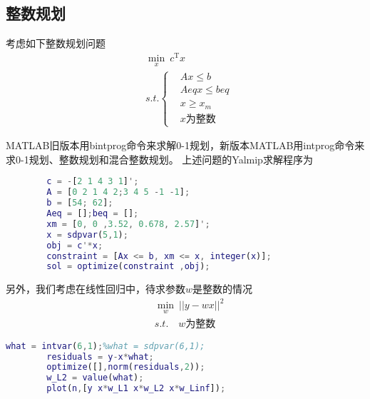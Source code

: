    \subsection{整数规划}
        \par
        考虑如下整数规划问题
        \begin{align*}
        & \min_x \ c^\mathrm{T}x\\
        & s.t.\left\{
        \begin{aligned}
        & Ax \leqslant b\\
        & Aeq x \leqslant beq\\
        & x \geqslant x_m\\
        & x\text{为整数}
        \end{aligned}
        \right.
        \end{align*}
        \par
        MATLAB旧版本用bintprog命令来求解0-1规划，新版本MATLAB用intprog命令来求0-1规划、整数规划和混合整数规划。
        上述问题的Yalmip求解程序为
        \begin{lstlisting}[language = Matlab]
        %% 整数规划
        c = -[2 1 4 3 1]';
        A = [0 2 1 4 2;3 4 5 -1 -1];
        b = [54; 62];
        Aeq = [];beq = [];
        xm = [0, 0 ,3.52, 0.678, 2.57]';
        x = sdpvar(5,1);
        obj = c'*x;
        constraint = [Ax <= b, xm <= x, integer(x)];
        sol = optimize(constraint ,obj);
        \end{lstlisting}
        \par
        另外，我们考虑在线性回归中，待求参数$w$是整数的情况
        \begin{align*}
        &\min_w \ ||y - wx||^2\\
        &s.t.\quad w\text{为整数}
        \end{align*}
        \begin{lstlisting}[language = Matlab]
        what = intvar(6,1);%what = sdpvar(6,1);
        residuals = y-x*what;
        optimize([],norm(residuals,2));
        w_L2 = value(what);
        plot(n,[y x*w_L1 x*w_L2 x*w_Linf]);
        \end{lstlisting}
